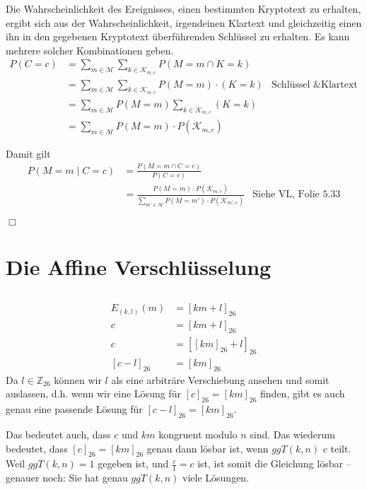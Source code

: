 \documentclass{../crypto}
\begin{document}
Die Wahrscheinlichkeit des Ereignisses, einen bestimmten Kryptotext zu erhalten,
ergibt sich aus der Wahrscheinlichkeit, irgendeinen Klartext und gleichzeitig
einen ihn in den gegebenen Kryptotext überführenden Schlüssel zu erhalten. Es
kann mehrere solcher Kombinationen geben.
\begin{align*}
   P(C=c) &= \sum\limits_{m\in\mathcal{M}} \sum\limits_{k\in\mathcal{K}_{m,c}}P(M=m \cap K=k) \\
          &= \sum\limits_{m\in\mathcal{M}} \sum\limits_{k\in\mathcal{K}_{m,c}}P(M=m)\cdot(K=k) & \text{Schlüssel \& Klartext unabhängig} \\
          &= \sum\limits_{m\in\mathcal{M}} P(M=m) \sum\limits_{k\in\mathcal{K}_{m,c}}(K=k) \\
          &= \sum\limits_{m\in\mathcal{M}} P(M=m)\cdot P(\mathcal{K}_{m,c})
\end{align*}

Damit gilt 
\begin{align*}
   P(M=m \mid C=c) &= \frac{P(M=m \cap C=c)}{P(C=c)} \\
                   &= \frac{P(M=m)\cdot
P(\mathcal{K}_{m,c})}{\sum_{m'\in\mathcal{M}} P(M=m')\cdot
P(\mathcal{K}_{m',c})} & \text{Siehe VL, Folie 5.33}
\end{align*}

\hfill$\Box$

\section{Die Affine Verschlüsselung}

\subsection{}

\begin{align*}
E_{(k,l)}(m)&=\left[km+l\right]_{26}\\
c&=\left[km+l\right]_{26}\\
c&=\left[\left[km\right]_{26} + l\right]_{26}\\
\left[c - l\right]_{26}&=\left[km\right]_{26}
\end{align*}
Da $l \in \mathbb{Z}_{26}$ können wir $l$ als eine arbiträre Verschiebung ansehen
und somit auslassen, d.h. wenn wir eine Lösung für
$\left[c\right]_{26}=\left[km\right]_{26}$ finden, gibt es auch genau eine
passende Lösung für $\left[c - l\right]_{26}=\left[km\right]_{26}$.

Das bedeutet auch, dass $c$ und $km$ kongruent modulo $n$ sind.
Das wiederum bedeutet, dass $\left[c\right]_{26}=\left[km\right]_{26}$ genau
dann lösbar ist, wenn $ggT(k,n)$ $c$ teilt. Weil $ggT(k,n)=1$ gegeben ist, und
$\frac{c}{1}=c$ ist, ist somit die Gleichung lösbar -- genauer noch: Sie hat
genau $ggT(k,n)$ viele Lösungen.
\end{document}
